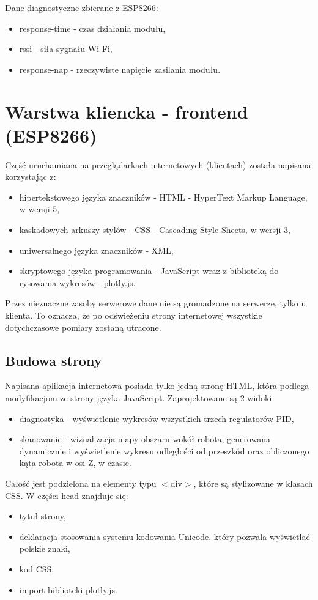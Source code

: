 \documentclass[a4paper,12pt,twoside,openany]{report}
\begin{document}
\noindent Dane diagnostyczne zbierane z ESP8266:
\begin{itemize}
\item response-time - czas działania modułu,
\item rssi - siła sygnału Wi-Fi,
\item response-nap - rzeczywiste napięcie zasilania modułu.
\end{itemize}

\section{Warstwa kliencka - frontend (ESP8266)}

Część uruchamiana na przeglądarkach internetowych (klientach) została napisana korzystając z:
\begin{itemize}
\item hipertekstowego języka znaczników - HTML - HyperText Markup Language, w wersji 5,
\item kaskadowych arkuszy stylów - CSS - Cascading Style Sheets, w wersji 3,
\item uniwersalnego języka znaczników - XML,
\item skryptowego języka programowania - JavaScript wraz z biblioteką do rysowania wykresów - plotly.js.
\end{itemize}
Przez nieznaczne zasoby serwerowe dane nie są gromadzone na serwerze, tylko u klienta. To oznacza, że po odświeżeniu strony internetowej wszystkie dotychczasowe pomiary zostaną utracone. 

\subsection{Budowa strony}

Napisana aplikacja internetowa posiada tylko jedną stronę HTML, która podlega modyfikacjom ze strony języka JavaScript. Zaprojektowane są 2 widoki: 
\begin{itemize}
\item diagnostyka - wyświetlenie wykresów wszystkich trzech regulatorów PID,
\item skanowanie - wizualizacja mapy obszaru wokół robota, generowana dynamicznie i wyświetlenie wykresu odległości od przeszkód oraz obliczonego kąta robota w osi Z, w czasie.
\end{itemize}

\newpage
Całość jest podzielona na elementy typu $<$div$>$, które są stylizowane w klasach CSS. W części head znajduje się: 
\begin{itemize}
\item tytuł strony,
\item deklaracja stosowania systemu kodowania Unicode, który pozwala wyświetlać polskie znaki,
\item kod CSS,
\item import biblioteki plotly.js.
\end{itemize}
\end{document}

